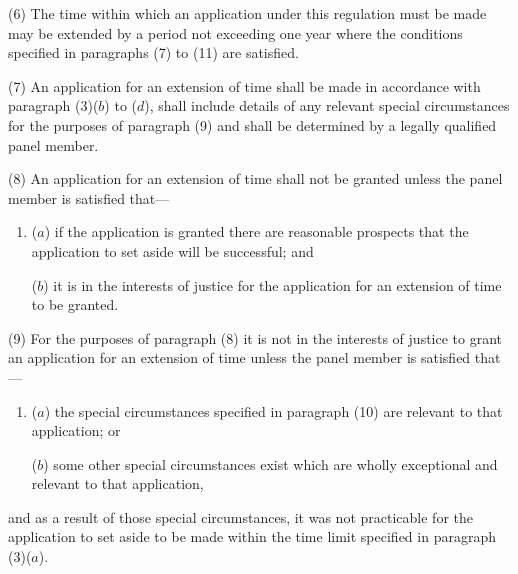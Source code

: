 \documentclass[12pt,a4paper]{article}
\begin{document}
%
%
%
%

(6) The time within which an application under this regulation must be made may be extended by a period not exceeding one year where the conditions specified in paragraphs (7) to (11) are satisfied.

(7) An application for an extension of time shall be made in accordance with paragraph (3)($b$)  to ($d$), shall include details of any relevant special circumstances for the purposes of paragraph (9) and shall be determined by a legally qualified panel member.

(8) An application for an extension of time shall not be granted unless the panel member is satisfied that—
\begin{enumerate}\item[]
\begin{sloppypar}
($a$) if the application is granted there are reasonable prospects that the application to set aside will be successful; and
\end{sloppypar}

($b$) it is in the interests of justice for the application for an extension of time to be granted.
\end{enumerate}

(9) For the purposes of paragraph (8) it is not in the interests of justice to grant an application for an extension of time unless the panel member is satisfied that—
\begin{enumerate}\item[]
($a$) the special circumstances specified in paragraph (10) are relevant to that application; or

($b$) some other special circumstances exist which are wholly exceptional and relevant to that application,
\end{enumerate}
and as a result of those special circumstances, it was not practicable for the application to set aside to be made within the time limit specified in paragraph (3)($a$).
\end{document}
